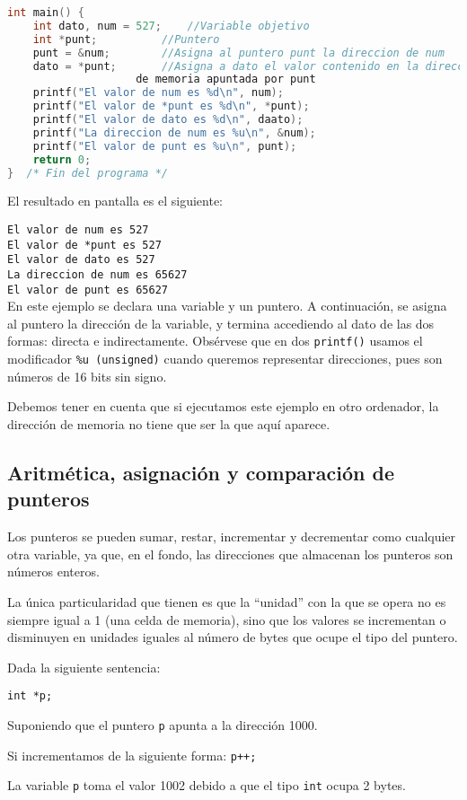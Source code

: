 {\begin{Ejemplo}
\begin{lstlisting}[language=C]
int main() {
    int dato, num = 527;	//Variable objetivo
    int *punt;			//Puntero
    punt = &num;		//Asigna al puntero punt la direccion de num
    dato = *punt;		//Asigna a dato el valor contenido en la direccion
    				de memoria apuntada por punt
    printf("El valor de num es %d\n", num);
    printf("El valor de *punt es %d\n", *punt);
    printf("El valor de dato es %d\n", daato);
    printf("La direccion de num es %u\n", &num);
    printf("El valor de punt es %u\n", punt);
    return 0;
}  /* Fin del programa */
\end{lstlisting}
El resultado en pantalla es el siguiente:

\texttt{El valor de num es 527}\\
\texttt{El valor de *punt es 527}\\
\texttt{El valor de dato es 527}\\
\texttt{La direccion de num es 65627}\\
\texttt{El valor de punt es 65627}\\
\Explicacion
En este ejemplo se declara una variable y un puntero. A continuación, se asigna al puntero la dirección de la variable, y termina accediendo al dato de las dos formas: directa e indirectamente. Obsérvese que en dos \texttt{printf()} usamos el modificador \texttt{\%u (unsigned)} cuando queremos representar direcciones, pues son números de 16 bits sin signo.

Debemos tener en cuenta que si ejecutamos este ejemplo en otro ordenador, la dirección de memoria no tiene que ser la que aquí aparece.\\
\end{Ejemplo}
}
\subsection{Aritmética, asignación y comparación de punteros}{
Los punteros se pueden sumar, restar, incrementar y decrementar como cualquier otra variable, ya que, en el fondo, las direcciones que almacenan los punteros son números enteros.

La única particularidad que tienen es que la ``unidad'' con la que se opera no es siempre igual a 1 (una celda de memoria), sino que los valores se incrementan o disminuyen en unidades iguales al número de bytes que ocupe el tipo del puntero.
\begin{Ejemplo}
Dada la siguiente sentencia:

\texttt{int *p;}

Suponiendo que el puntero \texttt{p} apunta a la dirección 1000.

Si incrementamos de la siguiente forma: \texttt{p++;}

La variable \texttt{p} toma el valor 1002 debido a que el tipo \texttt{int} ocupa 2 bytes.
\end{Ejemplo}
}
